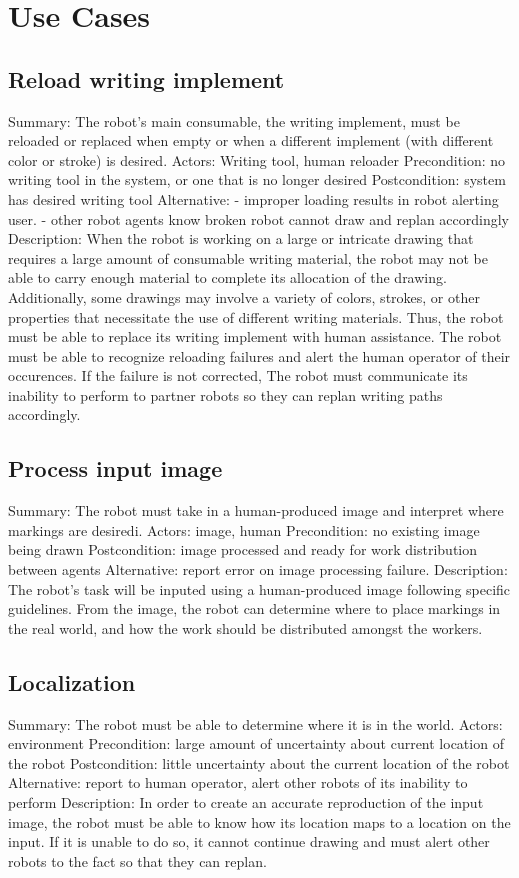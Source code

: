 
\section{Use Cases}
\label{sec:use_cases}

\subsection{Reload writing implement}
Summary: The robot's main consumable, the writing implement, must be reloaded or replaced when empty or when
a different implement (with different color or stroke) is desired.
Actors:  Writing tool, human reloader
Precondition: no writing tool in the system, or one that is no longer desired
Postcondition: system has desired writing tool
Alternative: - improper loading results in robot alerting user.
             - other robot agents know broken robot cannot draw and replan accordingly
Description: When the robot is working on a large or intricate drawing that requires a large amount
of consumable writing material, the robot may not be able to carry enough material to complete its
allocation of the drawing. Additionally, some drawings may involve a variety of colors, strokes, or other
properties that necessitate the use of different writing materials. Thus, the robot must be able to
replace its writing implement with human assistance. The robot must be able to recognize reloading
failures and alert the human operator of their occurences. If the failure is not corrected, The robot must
communicate its inability to perform to partner robots so they can replan writing paths accordingly.

\subsection{Process input image}
Summary: The robot must take in a human-produced image and interpret where markings are desiredi.
Actors: image, human
Precondition:  no existing image being drawn
Postcondition: image processed and ready for work distribution between agents
Alternative: report error on image processing failure.
Description: The robot's task will be inputed using a human-produced image following specific guidelines.
From the image, the robot can determine where to place markings in the real world, and how the work should
be distributed amongst the workers.

\subsection{Localization}
Summary: The robot must be able to determine where it is in the world.
Actors: environment
Precondition: large amount of uncertainty about current location of the robot
Postcondition: little uncertainty about the current location of the robot
Alternative: report to human operator, alert other robots of its inability to perform
Description: In order to create an accurate reproduction of the input image, the robot must be able to know
how its location maps to a location on the input. If it is unable to do so, it cannot continue drawing
and must alert other robots to the fact so that they can replan.

